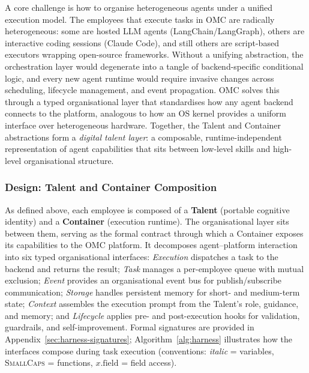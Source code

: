 \documentclass[11pt,a4paper]{article}
\begin{document}
A core challenge is how to organise heterogeneous agents under a unified execution model.  The employees that execute tasks in OMC are radically heterogeneous: some are hosted LLM agents (LangChain/LangGraph), others are interactive coding sessions (Claude Code), and still others are script-based executors wrapping open-source frameworks.  Without a unifying abstraction, the orchestration layer would degenerate into a tangle of backend-specific conditional logic, and every new agent runtime would require invasive changes across scheduling, lifecycle management, and event propagation.  OMC solves this through a typed organisational layer that standardises how any agent backend connects to the platform, analogous to how an OS kernel provides a uniform interface over heterogeneous hardware.  Together, the Talent and Container abstractions form a \emph{digital talent layer}: a composable, runtime-independent representation of agent capabilities that sits between low-level skills and high-level organisational structure.

\subsubsection{Design: Talent and Container Composition}

As defined above, each employee is composed of a \textbf{Talent} (portable cognitive identity) and a \textbf{Container} (execution runtime).  The organisational layer sits between them, serving as the formal contract through which a Container exposes its capabilities to the OMC platform.  It decomposes agent--platform interaction into six typed organisational interfaces: \emph{Execution} dispatches a task to the backend and returns the result; \emph{Task} manages a per-employee queue with mutual exclusion; \emph{Event} provides an organisational event bus for publish/subscribe communication; \emph{Storage} handles persistent memory for short- and medium-term state; \emph{Context} assembles the execution prompt from the Talent's role, guidance, and memory; and \emph{Lifecycle} applies pre- and post-execution hooks for validation, guardrails, and self-improvement.  Formal signatures are provided in Appendix~\ref{sec:harness-signatures}; Algorithm~\ref{alg:harness} illustrates how the interfaces compose during task execution (conventions: \textit{italic} = variables, \textsc{SmallCaps} = functions, $x.\mathrm{field}$ = field access).
\end{document}
